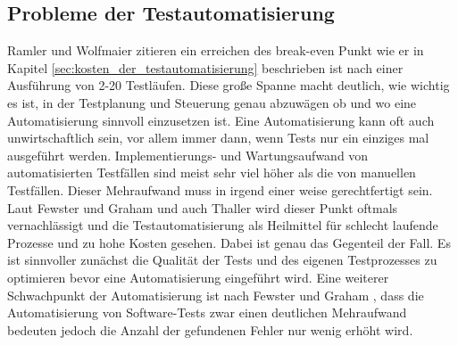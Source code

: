 \subsection{Probleme der Testautomatisierung}
\label{sec:probleme_der_testautomatisierung}
Ramler und Wolfmaier \cite{ramler_economic_2006} zitieren ein erreichen des break-even Punkt wie er in Kapitel \ref{sec:kosten_der_testautomatisierung} beschrieben ist nach einer Ausführung von 2-20 Testläufen. Diese große Spanne macht deutlich, wie wichtig es ist, in der Testplanung und Steuerung genau abzuwägen ob und wo eine Automatisierung sinnvoll einzusetzen ist. Eine Automatisierung kann oft auch unwirtschaftlich sein, vor allem immer dann, wenn Tests nur ein einziges mal ausgeführt werden. Implementierungs- und Wartungsaufwand von automatisierten Testfällen sind meist sehr viel höher als die von manuellen Testfällen. Dieser Mehraufwand muss in irgend einer weise gerechtfertigt sein. Laut Fewster und Graham \cite[vgl. S. 22 ff.]{fewster_software_1999} und auch Thaller \cite[vgl. S.230 ff.]{thaller_software-test_2002} wird dieser Punkt oftmals vernachlässigt und die Testautomatisierung als Heilmittel für schlecht laufende Prozesse und zu hohe Kosten gesehen. Dabei ist genau das Gegenteil der Fall. Es ist sinnvoller zunächst die Qualität der Tests und des eigenen Testprozesses zu optimieren bevor eine Automatisierung eingeführt wird. 
Eine weiterer Schwachpunkt der Automatisierung ist nach Fewster und Graham \cite[vgl. S. 22 ff.]{fewster_software_1999}, dass die Automatisierung von Software-Tests zwar einen deutlichen Mehraufwand bedeuten jedoch die Anzahl der gefundenen Fehler nur wenig erhöht wird.

